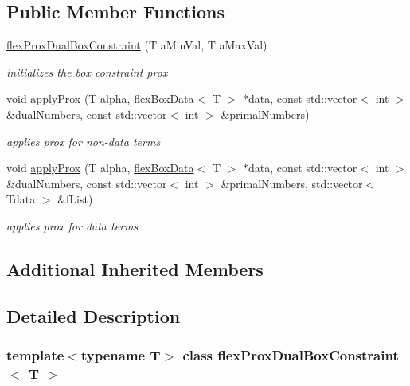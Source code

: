 \subsection*{Public Member Functions}
\begin{DoxyCompactItemize}
\item 
\hyperlink{classflex_prox_dual_box_constraint_a2654a4ed37ad0eba9e6808f2a72ea1b3}{flex\+Prox\+Dual\+Box\+Constraint} (T a\+Min\+Val, T a\+Max\+Val)
\begin{DoxyCompactList}\small\item\em initializes the box constraint prox \end{DoxyCompactList}\item 
void \hyperlink{classflex_prox_dual_box_constraint_a53df35f535f7df3da4e24f6190be2f7f}{apply\+Prox} (T alpha, \hyperlink{classflex_box_data}{flex\+Box\+Data}$<$ T $>$ $\ast$data, const std\+::vector$<$ int $>$ \&dual\+Numbers, const std\+::vector$<$ int $>$ \&primal\+Numbers)
\begin{DoxyCompactList}\small\item\em applies prox for non-\/data terms \end{DoxyCompactList}\item 
void \hyperlink{classflex_prox_dual_box_constraint_a417cfa67f4bffbfc102de872a3456990}{apply\+Prox} (T alpha, \hyperlink{classflex_box_data}{flex\+Box\+Data}$<$ T $>$ $\ast$data, const std\+::vector$<$ int $>$ \&dual\+Numbers, const std\+::vector$<$ int $>$ \&primal\+Numbers, std\+::vector$<$ Tdata $>$ \&f\+List)
\begin{DoxyCompactList}\small\item\em applies prox for data terms \end{DoxyCompactList}\end{DoxyCompactItemize}
\subsection*{Additional Inherited Members}


\subsection{Detailed Description}
\subsubsection*{template$<$typename T$>$\newline
class flex\+Prox\+Dual\+Box\+Constraint$<$ T $>$}

